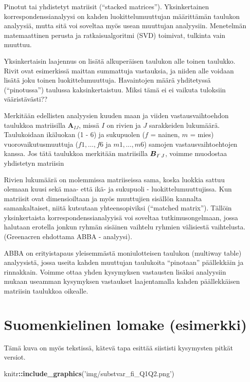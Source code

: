 \documentclass[
  finnish,
]{book}
\newenvironment{Shaded}{\begin{snugshade}}{\end{snugshade}}
\newcommand{\KeywordTok}[1]{\textcolor[rgb]{0.13,0.29,0.53}{\textbf{#1}}}
\newcommand{\NormalTok}[1]{#1}
\newcommand{\OperatorTok}[1]{\textcolor[rgb]{0.81,0.36,0.00}{\textbf{#1}}}
\newcommand{\StringTok}[1]{\textcolor[rgb]{0.31,0.60,0.02}{#1}}
\begin{document}
Pinotut tai yhdistetyt matriisit (``stacked matrices''). Yksinkertainen
korrespondenssianalyysi on kahden luokittelumuuttujan määrittämän
taulukon analyysiä, mutta sitä voi soveltaa myös usean muuttujan
analyysiin. Menetelmän matemaattinen perusta ja ratkaisualgoritmi (SVD)
toimivat, tulkinta vain muuttuu.

Yksinkertaisin laajennus on lisätä alkuperäisen taulukon alle toinen
taulukko. Rivit ovat esimerkissä maittan summattuja vastauksia, ja
niiden alle voidaan lisätä joku toinen luokittelumuuttuja. Havaintojen
määrä yhditetyssä (``pinotussa'') taulussa kaksinkertaistuu. Miksi tämä
ei ei vaikuta tuloksiin vääristävästi??

Merkitään edellisten analyysien kuuden maan ja viiden vastausvaihtoehdon
taulukkoa matriisilla \(\boldsymbol{ A}_{I J}\), missä \(I\) on rivien
ja \(J\) sarakkeiden lukumäärä. Taulukoidaan ikäluokan (1 - 6) ja
sukupuolen (\(f\) = nainen, \(m\) = mies) vuorovaikutusmuuttuja
(\(f1,\dots , f6\) ja \(m1,\dots , m6\)) samojen vastausvaihtoehtojen
kanssa. Jos tätä taulukkoa merkitään matriisilla
\(\boldsymbol{ B}_{I^{`} J}\), voimme muodostaa yhdistetyn matriisin

Rivien lukumäärä on molemmissa matriiseissa sama, koska luokkia sattuu
olemaan kuusi sekä maa- että ikä- ja sukupuoli - luokittelumuuttujissa.
Kun matriisit ovat dimensioiltaan ja myös muuttujien sisällön kannalta
samankaltaiset, niitä kutsutaan yhteensopiviksi (``matched matrix'').
Tällöin yksinkertaista korrespondenssianalyyisä voi soveltaa
tutkimusongelmaan, jossa halutaan erotella jonkun ryhmän sisäinen
vaihtelu ryhmien välisiestä vaihtelusta. (Greenacren ehdottama ABBA -
analyysi).

ABBA on erityistapaus yleisemmästä moniulotteisen taulukon (multiway
table) analyysistä, jossa useita kahden muuttujan taulukoita
``pinotaan'' päällekkäin ja rinnakkain. Voimme ottaa yhden kysymyksen
vastausten lisäksi analyysiin mukaan useamman kysymyksen vastaukset
laajentamalla kahden päällekkäisen matriisin taulukkoa oikealle.

\hypertarget{suomenkielinen-lomake-esimerkki}{%
\section{Suomenkielinen lomake
(esimerkki)}\label{suomenkielinen-lomake-esimerkki}}

Tämä kuva on myös tekstissä, kätevä tapa esittää siististi kysymysten
pitkät versiot.

\begin{Shaded}
\begin{Highlighting}[]
\NormalTok{knitr}\OperatorTok{::}\KeywordTok{include_graphics}\NormalTok{(}\StringTok{'img/substvar_fi_Q1Q2.png'}\NormalTok{)}
\end{Highlighting}
\end{Shaded}
\end{document}
